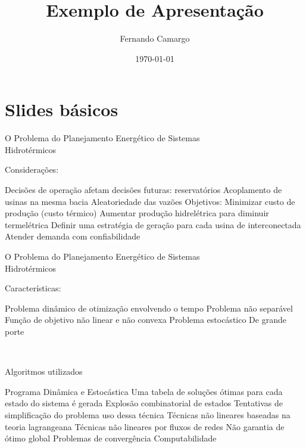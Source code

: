 \documentclass{beamer}
\title{Exemplo de Apresentação}
\date{\today}
\author{Fernando Camargo}
\institute{ZG Soluções}
\begin{document}
\maketitle

\section{Slides básicos}

\begin{frame}{O Problema do Planejamento Energético de Sistemas\\Hidrotérmicos}
  
  Considerações:
  \begin{outline}
     Decisões de operação afetam decisões futuras: reservatórios
     Acoplamento de usinas na mesma bacia
     Aleatoriedade das vazões
     Objetivos:
       Minimizar custo de produção (custo térmico)
       Aumentar produção hidrelétrica para diminuir termelétrica
       Definir uma estratégia de geração para cada usina de interconectada
       Atender demanda com confiabilidade
  \end{outline}
\end{frame}

\begin{frame}{O Problema do Planejamento Energético de Sistemas\\Hidrotérmicos}
  
  Características:
  \begin{outline}
     Problema dinâmico de otimização envolvendo o tempo
     Problema não separável
     Função de objetivo não linear e não convexa
     Problema estocástico
     De grande porte
  \end{outline}
  \\
\end{frame}

\begin{frame}{Algoritmos utilizados}
  
  \begin{outline}
  \0 
     Programa Dinâmica e Estocástica
      \2 Uma tabela de soluções ótimas para cada estado do sistema é gerada
      \2 Explosão combinatorial de estados
      \2 Tentativas de simplificação do problema uso dessa técnica
     Técnicas não lineares baseadas na teoria lagrangeana
     Técnicas não lineares por fluxos de redes
  \0 
     Não garantia de ótimo global
     Problemas de convergência 
     Computabilidade
  \end{outline}
\end{frame}
\end{document}
